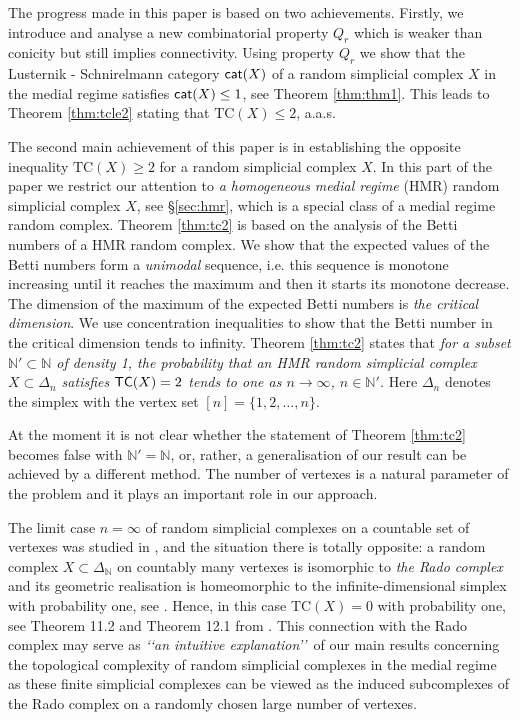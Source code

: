 \documentclass[11pt,twoside, reqno]{amsart}
\theoremstyle{plain}
\theoremstyle{definition}
\newcommand{\N}{\mathbb{N}}
\newcommand{\TC}{\textrm{TC}}
\newcommand{\cat}{{\sf{cat}}}
\newcommand{\tc}{{\sf{TC}}}
\begin{document}
The progress made in this paper is based on two achievements. Firstly, we introduce and analyse a new combinatorial property $Q_r$ which is weaker than conicity but still implies connectivity. Using property $Q_r$ we show that the Lusternik - Schnirelmann category $\cat(X)$ 
of a random simplicial complex $X$ in the medial regime satisfies $\cat(X)\le 1$, see Theorem \ref{thm:thm1}. This leads to Theorem \ref{thm:tcle2} stating that $\TC(X)\le 2$, a.a.s. 

The second main achievement of this paper is in establishing the opposite inequality $\TC(X)\ge 2$ for a random simplicial complex $X$. 
In this part of the paper we restrict our attention to  {\it a homogeneous medial regime} (HMR) random simplicial complex $X$, see \S \ref{sec:hmr}, which is a special class of a medial regime random complex. 
Theorem \ref{thm:tc2} is based on the analysis of the Betti numbers of a HMR random complex. We show that the expected values of the Betti numbers form a {\it unimodal} sequence, i.e. this sequence is monotone increasing until it reaches the maximum and then it starts its monotone decrease. The dimension of the maximum of the expected Betti numbers is {\it the critical dimension}. We use concentration inequalities to show that the Betti number in the critical dimension tends to infinity. 
Theorem \ref{thm:tc2} states that {\it for a subset $\N'\subset \N$ of density 1, the probability that an HMR random simplicial complex $X\subset \Delta_n$ satisfies $\tc(X)=2$ tends to one as $n\to \infty$, $n\in \N'$. } Here $\Delta_n$ denotes the simplex with the vertex set $[n]= \{1, 2, \dots, n\}$. 
 

At the moment it is not clear whether the statement of Theorem \ref{thm:tc2} becomes false with $\N'=\N$, or, rather, a generalisation of our result can be achieved by a different method. The number of vertexes is a natural parameter of the problem and it plays an important role in our approach. 

The limit case $n=\infty$ of random simplicial complexes on a countable set of vertexes was studied in \cite{Far}, and the situation there is totally opposite:  a random complex $X\subset \Delta_{\N}$ on countably many vertexes is isomorphic to {\it the Rado complex} \cite{EFM} and its geometric realisation is homeomorphic to the infinite-dimensional simplex with probability one, see \cite{EFM}. Hence, in this case 
$\TC(X)=0$ with probability one, see Theorem 11.2 and Theorem 12.1 from \cite{Far}. 
This connection with the Rado complex \cite{EFM} may serve as {\it \lq\lq an intuitive explanation\rq\rq}\, of our main results concerning the topological complexity of random simplicial complexes in the medial regime as these finite simplicial complexes can be viewed as the induced subcomplexes of the Rado complex on a randomly chosen large number of vertexes. 
\end{document}
